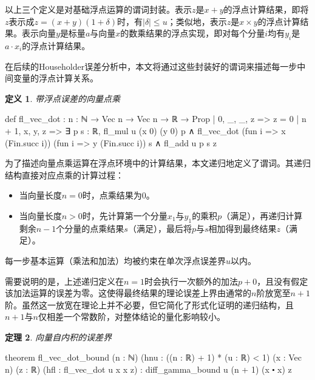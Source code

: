 ﻿\documentclass[UTF8,a4paper,openany]{ctexbook}
\theoremstyle{qrplain}
\newtheorem{definition}{定义}[chapter]
\newtheorem{theorem}[definition]{定理}
\begin{document}
以上三个定义是对基础浮点运算的谓词封装。表示$z$是$x+y$的浮点计算结果，即将$z$表示成$z=(x+y)(1+\delta)$时，有$|\delta|\le u$；类似地，表示$z$是$x\times y$的浮点计算结果。表示向量$y$是标量$a$与向量$x$的数乘结果的浮点实现，即对每个分量$i$均有$y_i$是$a\cdot x_i$的浮点计算结果。

在后续的Householder误差分析中，本文将通过这些封装好的谓词来描述每一步中间变量的浮点计算关系。

\begin{definition}
  带浮点误差的向量点乘
\end{definition}
\begin{leancode}
  def fl_vec_dot : {n : ℕ} → Vec n → Vec n → ℝ → Prop
    | 0, _, _, z => z = 0
    | n + 1, x, y, z =>
      ∃ p s : ℝ,
        fl_mul u (x 0) (y 0) p ∧
        fl_vec_dot
        (fun i => x (Fin.succ i))
        (fun i => y (Fin.succ i)) s ∧
        fl_add u p s z
\end{leancode}

为了描述向量点乘运算在浮点环境中的计算结果，本文递归地定义了谓词。其递归结构直接对应点乘的计算过程：

\begin{itemize}
  \item 当向量长度$n=0$时，点乘结果为$0$。
  \item 当向量长度$n>0$时，先计算第一个分量$x_1$与$y_1$的乘积$p$（满足），再递归计算剩余$n-1$个分量的点乘结果$s$（满足），最后将$p$与$s$相加得到最终结果$z$（满足）。
\end{itemize}

每一步基本运算（乘法和加法）均被约束在单次浮点误差界$u$以内。

需要说明的是，上述递归定义在$n=1$时会执行一次额外的加法$p+0$，且没有假定该加法运算的误差为零。这使得最终结果的理论误差上界由通常的$n$阶放宽至$n+1$阶。虽然这一放宽在理论上并不必要，但它简化了形式化证明的递归结构，且$n+1$与$n$仅相差一个常数阶，对整体结论的量化影响较小。

\begin{theorem}
\label{thm:fl-vec-dot-bound}
  向量自内积的误差界
\end{theorem}
\begin{leancode}
  theorem fl_vec_dot_bound
    (n : ℕ)
    (hnu : ((n : ℝ) + 1) * (u : ℝ) < 1)
    (x : Vec n) (z : ℝ)
    (hfl : fl_vec_dot u x x z) :
      diff_gamma_bound u (n + 1) (x ⬝ x) z 
\end{leancode}
\end{document}
